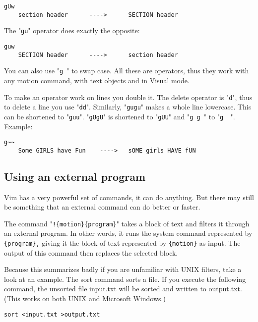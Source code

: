 \begin{Verbatim}[samepage=true]
                         gUw
    section header      ---->      SECTION header
\end{Verbatim}

The "\texttt{gu}" operator does exactly the opposite:

\begin{Verbatim}[samepage=true]
                         guw
    SECTION header      ---->      section header
\end{Verbatim}

You can also use "\texttt{g~}" to swap case.
All these are operators, thus they work with any motion command, with text objects and in Visual mode.

To make an operator work on lines you double it.
The delete operator is "\texttt{d}", thus to delete a line you use "\texttt{dd}".
Similarly, "\texttt{gugu}" makes a whole line lowercase.
This can be shortened to "\texttt{guu}".
"\texttt{gUgU}" is shortened to "\texttt{gUU}" and "\texttt{g~g~}" to "\texttt{g~~}".
Example:

\begin{Verbatim}[samepage=true]
                            g~~ 
    Some GIRLS have Fun    ---->   sOME girls HAVE fUN 
\end{Verbatim}
\subsection{Using an external program}
Vim has a very powerful set of commands, it can do anything.
But there may still be something that an external command can do better or faster.

The command "\texttt{!\{motion\}\{program\}}" takes a block of text and filters it through an external program.
In other words, it runs the system command represented by \texttt{\{program\},} giving it the block of text represented by \texttt{\{motion\}} as input.
The output of this command then replaces the selected block.

Because this summarizes badly if you are unfamiliar with UNIX filters, take a look at an example.
The sort command sorts a file.
If you execute the following command, the unsorted file input.txt will be sorted and written to output.txt.
(This works on both UNIX and Microsoft Windows.)

\begin{Verbatim}[samepage=true]
 sort <input.txt >output.txt
\end{Verbatim}

